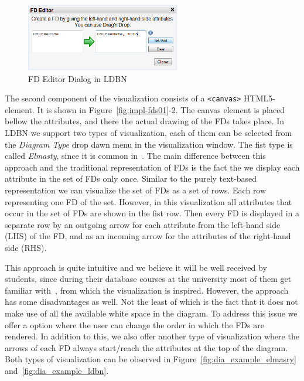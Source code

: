 \begin{figure}[h]
	\begin{center}
		\includegraphics[width=0.6\textwidth]{./img/fdeditor.png}
		\caption{FD Editor Dialog in LDBN}
		\label{fig:fdeditor}
	\end{center}
\end{figure}

The second component of the visualization consists of a \verb=<canvas>= HTML5-element. 
It is shown in Figure~\ref{fig:impl-fds01}-2.
The canvas element is placed bellow the attributes, and there the actual drawing 
of the FDs takes place. In LDBN we support two types of visualization, each of them can be selected
from the \emph{Diagram Type} drop dawn menu in the visualization window. The fist type is called 
\emph{Elmasty}, since it is common in~\cite{bdb1}. The main difference between this approach and
the traditional representation of FDs is the fact the we display each attribute in the set of 
FDs only once. 
Similar to the purely text-based representation we can visualize the set
of FDs as a set of rows. Each row representing one FD of the set. 
However, in this visualization all attributes that occur in the set of FDs
are shown in the fist row. Then every FD is displayed in a separate row by an outgoing 
arrow for each attribute from the left-hand side (LHS) of the FD,
and as an incoming arrow for the attributes of the right-hand side (RHS).

This approach is quite intuitive and we believe it will be well received by
students, since during their database courses at the university most of 
them get familiar with~\cite{bdb1}, from which
the visualization is inspired. However, the approach has some disadvantages
as well. Not the least of which is the fact that it does not make use
of all the available white space in the diagram. To address this issue
we offer a option where the user can change the order in which
the FDs are rendered. In addition to this, we also offer another type of
visualization where the arrows of each FD always start/reach the 
attributes at the top of the diagram. 
Both types of visualization can be observed in 
Figure~\ref{fig:dia_example_elmasry} and~\ref{fig:dia_example_ldbn}.

